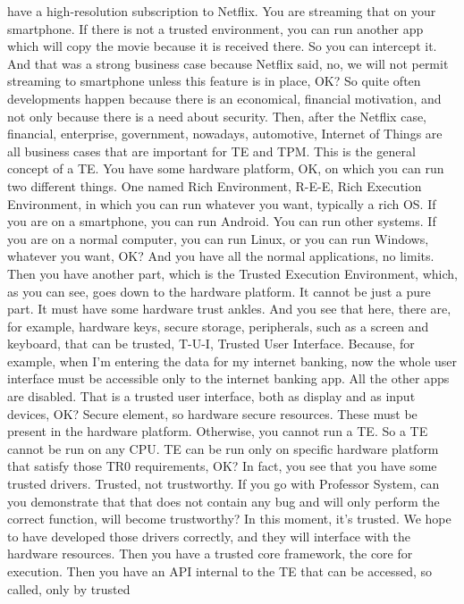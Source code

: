  have a high-resolution subscription to Netflix. You are streaming that on your
 smartphone. If there is not a trusted environment, you can run another app
 which will copy the movie because it is received there. So you can intercept
 it. And that was a strong business case because Netflix said, no, we will not
 permit streaming to smartphone unless this feature is in place, OK? So quite
 often developments happen because there is an economical, financial
 motivation, and not only because there is a need about security. Then, after
 the Netflix case, financial, enterprise, government, nowadays, automotive,
 Internet of Things are all business cases that are important for TE and TPM.
 This is the general concept of a TE. You have some hardware platform, OK, on
 which you can run two different things. One named Rich Environment, R-E-E,
 Rich Execution Environment, in which you can run whatever you want, typically
 a rich OS. If you are on a smartphone, you can run Android. You can run other
 systems. If you are on a normal computer, you can run Linux, or you can run
 Windows, whatever you want, OK? And you have all the normal applications, no
 limits. Then you have another part, which is the Trusted Execution
 Environment, which, as you can see, goes down to the hardware platform. It
 cannot be just a pure part. It must have some hardware trust ankles. And you
 see that here, there are, for example, hardware keys, secure storage,
 peripherals, such as a screen and keyboard, that can be trusted, T-U-I,
 Trusted User Interface. Because, for example, when I'm entering the data for
 my internet banking, now the whole user interface must be accessible only to
 the internet banking app. All the other apps are disabled. That is a trusted
 user interface, both as display and as input devices, OK? Secure element, so
 hardware secure resources. These must be present in the hardware platform.
 Otherwise, you cannot run a TE. So a TE cannot be run on any CPU. TE can be
 run only on specific hardware platform that satisfy those TR0 requirements,
 OK? In fact, you see that you have some trusted drivers. Trusted, not
 trustworthy. If you go with Professor System, can you demonstrate that that
 does not contain any bug and will only perform the correct function, will
 become trustworthy? In this moment, it's trusted. We hope to have developed
 those drivers correctly, and they will interface with the hardware resources.
 Then you have a trusted core framework, the core for execution. Then you have
 an API internal to the TE that can be accessed, so called, only by trusted
